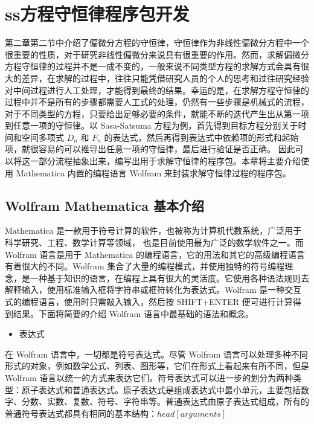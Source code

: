 
\chapter{ss方程守恒律程序包开发}
第二章第二节中介绍了偏微分方程的守恒律，守恒律作为非线性偏微分方程中一个很重要的性质，对于研究非线性偏微分来说具有很重要的作用。然而，求解偏微分方程守恒律的过程并不是一成不变的，一般来说不同类型方程的求解方式会具有很大的差异，在求解的过程中，往往只能凭借研究人员的个人的思考和过往研究经验对中间过程进行人工处理，才能得到最终的结果。幸运的是，在求解方程守恒律的过程中并不是所有的步骤都需要人工式的处理，仍然有一些步骤是机械式的流程，对于不同类型的方程，只要给出足够必要的条件，就能不断的迭代产生出从第一项到任意一项的守恒律。以 Sasa-Satsuma 方程为例，首先得到目标方程分别关于时间和空间多项式 $D_n$ 和 $F_n$ 的表达式，然后再得到表达式中依赖项的形式和起始项，就很容易的可以推导出任意一项的守恒律，最后进行验证是否正确。 因此可以将这一部分流程抽象出来，编写出用于求解守恒律的程序包。本章将主要介绍使用 Mathematica 内置的编程语言 Wolfram 来封装求解守恒律过程的程序包。

\section{Wolfram Mathematica 基本介绍}
Mathematica 是一款用于符号计算的软件，也被称为计算机代数系统，广泛用于科学研究、工程、数学计算等领域， 也是目前使用最为广泛的数学软件之一。而 Wolfram 语言是用于 Mathematica 的编程语言，它的用法和其它的高级编程语言有着很大的不同。Wolfram 集合了大量的编程模式，并使用独特的符号编程理念，是一种基于知识的语言，在编程上具有很大的灵活度。它使用各种语法规则去解释输入，使用标准输入框将字符串或框符转化为表达式。Wolfram 是一种交互式的编程语言，使用时只需敲入输入，然后按 SHIFT+ENTER 便可进行计算得到结果。下面将简要的介绍 Wolfram 语言中最基础的语法和概念。
\begin{itemize}
    \item 表达式
\end{itemize}

在 Wolfram 语言中，一切都是符号表达式。尽管 Wolfram 语言可以处理多种不同形式的对象，例如数学公式、列表、图形等，它们在形式上看起来有所不同，但是 Wolfram 语言以统一的方式来表达它们。符号表达式可以进一步的划分为两种类型：原子表达式和普通表达式。原子表达式是组成表达式中最小单元，主要包括数字、分数、实数、复数、符号、字符串等。普通表达式由原子表达式组成，所有的普通符号表达式都具有相同的基本结构：$head[arguments]$

